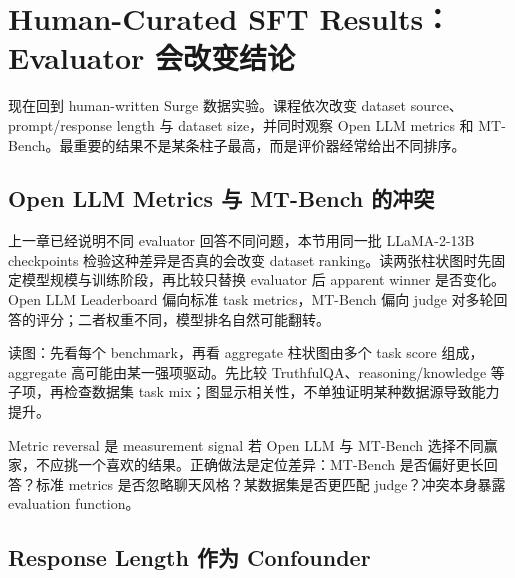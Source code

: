 \section{Human-Curated SFT Results：Evaluator 会改变结论}

现在回到 human-written Surge 数据实验。课程依次改变 dataset source、prompt/response length 与 dataset size，并同时观察 Open LLM metrics 和 MT-Bench。最重要的结果不是某条柱子最高，而是评价器经常给出不同排序。

\subsection{Open LLM Metrics 与 MT-Bench 的冲突}

上一章已经说明不同 evaluator 回答不同问题，本节用同一批 LLaMA-2-13B checkpoints 检验这种差异是否真的会改变 dataset ranking。读两张柱状图时先固定模型规模与训练阶段，再比较只替换 evaluator 后 apparent winner 是否变化。Open LLM Leaderboard 偏向标准 task metrics，MT-Bench 偏向 judge 对多轮回答的评分；二者权重不同，模型排名自然可能翻转。


\begin{knowledgebox}{读图：先看每个 benchmark，再看 aggregate}
柱状图由多个 task score 组成，aggregate 高可能由某一强项驱动。先比较 TruthfulQA、reasoning/knowledge 等子项，再检查数据集 task mix；图显示相关性，不单独证明某种数据源导致能力提升。
\end{knowledgebox}


\begin{warningbox}{Metric reversal 是 measurement signal}
若 Open LLM 与 MT-Bench 选择不同赢家，不应挑一个喜欢的结果。正确做法是定位差异：MT-Bench 是否偏好更长回答？标准 metrics 是否忽略聊天风格？某数据集是否更匹配 judge？冲突本身暴露 evaluation function。
\end{warningbox}


\subsection{Response Length 作为 Confounder}

